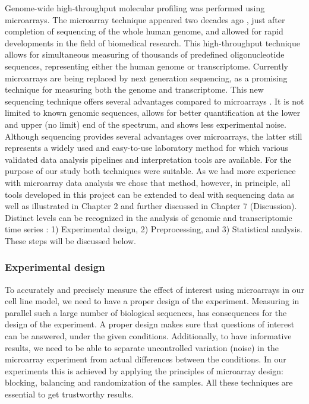 Genome-wide high-throughput molecular profiling was performed using microarrays. The microarray technique appeared two decades ago \cite{Schena1995}, just after completion of sequencing of the whole human genome, and allowed for rapid developments in the field of biomedical research. This high-throughput technique allows for simultaneous measuring of thousands of predefined oligonucleotide sequences, representing either the human genome or transcriptome. Currently microarrays are being replaced by next generation sequencing, as a promising technique for measuring both the genome and transcriptome. This new sequencing technique offers several advantages compared to microarrays \cite{Wang2009}. It is not limited to known genomic sequences, allows for better quantification at the lower and upper (no limit) end of the spectrum, and shows less experimental noise. Although sequencing provides several advantages over microarrays, the latter still represents a widely used and easy-to-use laboratory method for which various validated data analysis pipelines and interpretation tools are available. For the purpose of our study both techniques were suitable. As we had more experience with microarray data analysis we chose that method, however, in principle, all tools developed in this project can be extended to deal with sequencing data as well as illustrated in Chapter 2 \cite{Miok2014} and further discussed in Chapter 7 (Discussion). Distinct levels can be recognized in the analysis of genomic and transcriptomic time series : 1) Experimental design, 2) Preprocessing, and 3) Statistical analysis. These steps will be discussed below. 

\subsubsection{Experimental design}

To accurately and precisely measure the effect of interest using microarrays in our cell line model, we need to have a proper design of the experiment. Measuring in parallel such a large number of biological sequences, has consequences for the design of the experiment. A proper design makes sure that questions of interest can be answered, under the given conditions. Additionally, to have informative results, we need to be able to separate uncontrolled variation (noise) in the microarray experiment from actual differences between the conditions. In our experiments this is achieved by applying the principles of microarray design: blocking, balancing and randomization of the samples. All these techniques are essential to get trustworthy results.


